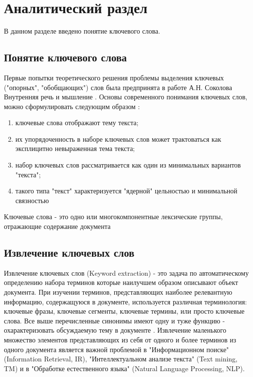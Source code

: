 \section{Аналитический раздел}
В данном разделе введено понятие ключевого слова.

\subsection{Понятие ключевого слова}

Первые попытки теоретического решения проблемы выделения ключевых ("опорных", "обобщающих") слов была предпринята в работе А.Н. Соколова Внутренняя речь и мышление \cite{6}.
Основы современного понимания ключевых слов, можно сформулировать следующим образом \cite{7}:
\begin{enumerate}
	\item ключевые слова отображают тему текста;
	\item их упорядоченность в наборе ключевых слов может трактоваться как эксплицитно невыраженная тема текста;
	\item набор ключевых слов рассматривается как один из минимальных вариантов "текста";
	\item такого типа "текст" характеризуется "ядерной" цельностью и минимальной связностью
\end{enumerate}

Ключевые слова - это одно или многокомпонентные лексические группы, отражающие содержание документа \cite{3}

\subsection{Извлечение ключевых слов}

Извлечение ключевых слов (Keyword extraction) - это задача по автоматическому определению набора терминов которые наилучшем образом описывают объект документа.
При изучении терминов, представляющих наиболее релевантную информацию, содержащуюся в документе, используется различная терминология: ключевые фразы, ключевые сегменты, ключевые термины, или просто ключевые слова.
Все выше перечисленные синонимы имеют одну и туже функцию - охарактеризовать обсуждаемую тему в документе \cite{4}.
Извлечение маленького множество элементов представляющих из себя от одного и более терминов из одного документа является важной проблемой в "Информационном поиске" (Information Retrieval, IR), "Интеллектуальном анализе текста" (Text mining, TM) и в "Обработке естественного языка" (Natural Language Processing, NLP).

